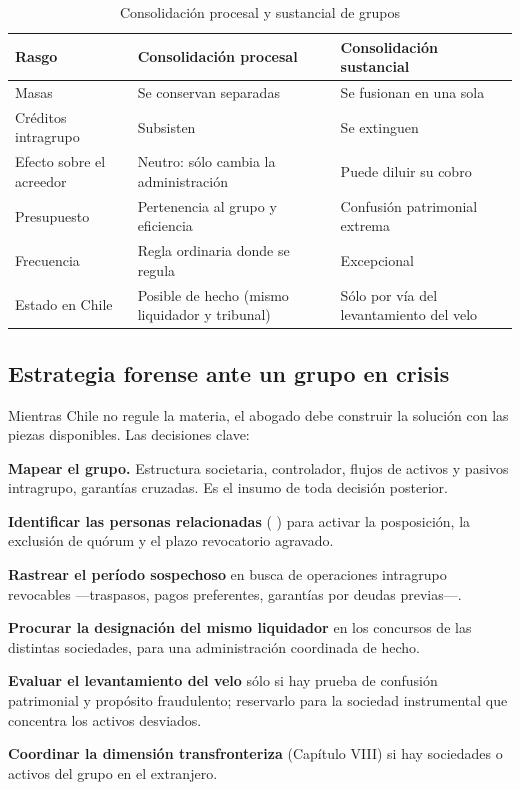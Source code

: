 \begin{table}[htbp]
\centering
\small
\caption{Consolidación procesal y sustancial de grupos}
\label{tab:cap13c-consolidacion}
\begin{tabularx}{\textwidth}{@{}>{\raggedright\arraybackslash}p{}
                                 >{\raggedright\arraybackslash}p{} X@{}}
\toprule
\textbf{Rasgo} & \textbf{Consolidación procesal} & \textbf{Consolidación sustancial} \\
\midrule
Masas & Se conservan separadas & Se fusionan en una sola \\
\addlinespace
Créditos intragrupo & Subsisten & Se extinguen \\
\addlinespace
Efecto sobre el acreedor & Neutro: sólo cambia la administración & Puede diluir su cobro \\
\addlinespace
Presupuesto & Pertenencia al grupo y eficiencia & Confusión patrimonial extrema \\
\addlinespace
Frecuencia & Regla ordinaria donde se regula & Excepcional \\
\addlinespace
Estado en Chile & Posible de hecho (mismo liquidador y tribunal) & Sólo por vía del levantamiento
del velo \\
\bottomrule
\end{tabularx}
\end{table}

\subsection{Estrategia forense ante un grupo en crisis}

Mientras Chile no regule la materia, el abogado debe construir la solución con las piezas
disponibles. Las decisiones clave:

\begin{checklist}
  \item \textbf{Mapear el grupo.} Estructura societaria, controlador, flujos de activos y pasivos
  intragrupo, garantías cruzadas. Es el insumo de toda decisión posterior.
  \item \textbf{Identificar las personas relacionadas} ( ) para activar la
  posposición, la exclusión de quórum y el plazo revocatorio agravado.
  \item \textbf{Rastrear el período sospechoso} en busca de operaciones intragrupo revocables
  ---traspasos, pagos preferentes, garantías por deudas previas---.
  \item \textbf{Procurar la designación del mismo liquidador} en los concursos de las distintas
  sociedades, para una administración coordinada de hecho.
  \item \textbf{Evaluar el levantamiento del velo} sólo si hay prueba de confusión patrimonial y
  propósito fraudulento; reservarlo para la sociedad instrumental que concentra los activos
  desviados.
  \item \textbf{Coordinar la dimensión transfronteriza} (Capítulo VIII) si hay sociedades o activos
  del grupo en el extranjero.
\end{checklist}

